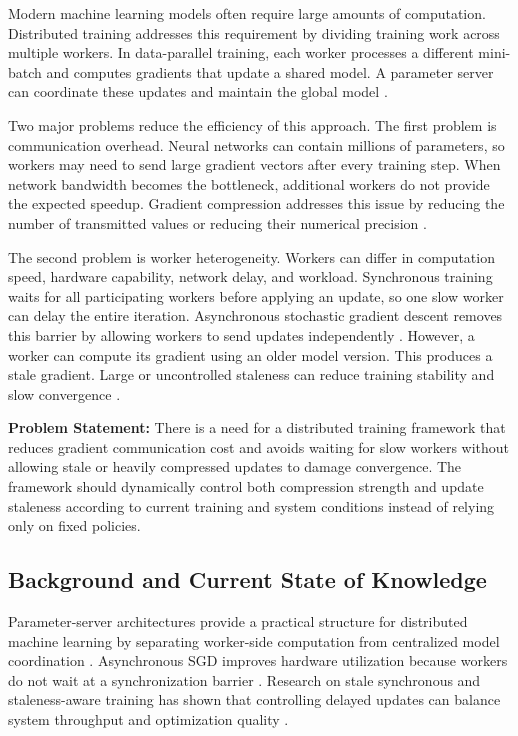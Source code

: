 \documentclass[conference]{IEEEtran}
\begin{document}
Modern machine learning models often require large amounts of computation. Distributed training addresses this requirement by dividing training work across multiple workers. In data-parallel training, each worker processes a different mini-batch and computes gradients that update a shared model. A parameter server can coordinate these updates and maintain the global model \cite{li2014ps}.

Two major problems reduce the efficiency of this approach. The first problem is communication overhead. Neural networks can contain millions of parameters, so workers may need to send large gradient vectors after every training step. When network bandwidth becomes the bottleneck, additional workers do not provide the expected speedup. Gradient compression addresses this issue by reducing the number of transmitted values or reducing their numerical precision \cite{alistarh2017qsgd,lin2018dgc}.

The second problem is worker heterogeneity. Workers can differ in computation speed, hardware capability, network delay, and workload. Synchronous training waits for all participating workers before applying an update, so one slow worker can delay the entire iteration. Asynchronous stochastic gradient descent removes this barrier by allowing workers to send updates independently \cite{lian2015async}. However, a worker can compute its gradient using an older model version. This produces a stale gradient. Large or uncontrolled staleness can reduce training stability and slow convergence \cite{zhang2016staleness,dutta2018stale}.

\textbf{Problem Statement:}
There is a need for a distributed training framework that reduces gradient communication cost and avoids waiting for slow workers without allowing stale or heavily compressed updates to damage convergence. The framework should dynamically control both compression strength and update staleness according to current training and system conditions instead of relying only on fixed policies.

\subsection{Background and Current State of Knowledge}

Parameter-server architectures provide a practical structure for distributed machine learning by separating worker-side computation from centralized model coordination \cite{li2014ps}. Asynchronous SGD improves hardware utilization because workers do not wait at a synchronization barrier \cite{lian2015async}. Research on stale synchronous and staleness-aware training has shown that controlling delayed updates can balance system throughput and optimization quality \cite{ho2013ssp,zhang2016staleness}.
\end{document}
